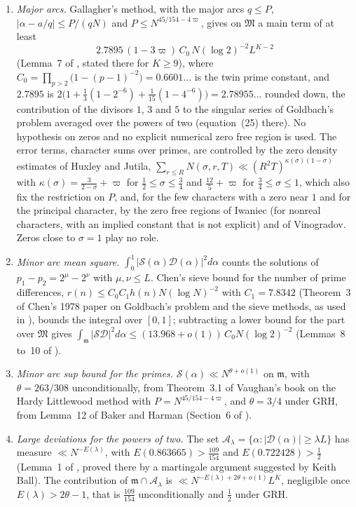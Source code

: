 \begin{enumerate}
\item[(1)] \emph{Major arcs.} Gallagher's method, with the major arcs $q\le P$, $|\alpha-a/q|\le P/(qN)$ and $P\le N^{45/154-4\varpi}$, gives on $\mathfrak M$ a main term of at least
\[
2.7895\,(1-3\varpi)\,C_0\,N(\log2)^{-2}L^{K-2}
\]
(Lemma~7 of \cite{HBP02}, stated there for $K\ge9$), where $C_0=\prod_{p>2}\big(1-(p-1)^{-2}\big)=0.6601\ldots$ is the twin prime constant, and $2.7895$ is $2\big(1+\tfrac13(1-2^{-6})+\tfrac1{15}(1-4^{-6})\big)=2.78955\ldots$ rounded down, the contribution of the divisors $1$, $3$ and $5$ to the singular series of Goldbach's problem averaged over the powers of two (equation~(25) there). No hypothesis on zeros and no explicit numerical zero free region is used. The error terms, character sums over primes, are controlled by the zero density estimates of Huxley and Jutila, $\sum_{r\le R}N(\sigma,r,T)\ll(R^2T)^{\kappa(\sigma)(1-\sigma)}$ with $\kappa(\sigma)=\tfrac3{2-\sigma}+\varpi$ for $\tfrac12\le\sigma\le\tfrac34$ and $\tfrac{12}5+\varpi$ for $\tfrac34\le\sigma\le1$, which also fix the restriction on $P$, and, for the few characters with a zero near $1$ and for the principal character, by the zero free regions of Iwaniec (for nonreal characters, with an implied constant that is not explicit) and of Vinogradov. Zeros close to $\sigma=1$ play no role.
\item[(2)] \emph{Minor arc mean square.} $\int_0^1|\mathcal S(\alpha)\mathcal D(\alpha)|^2d\alpha$ counts the solutions of $p_1-p_2=2^\mu-2^\nu$ with $\mu,\nu\le L$. Chen's sieve bound for the number of prime differences, $r(n)\le C_0C_1h(n)N(\log N)^{-2}$ with $C_1=7.8342$ (Theorem~3 of Chen's 1978 paper on Goldbach's problem and the sieve methods, as used in \cite{HBP02}), bounds the integral over $[0,1]$; subtracting a lower bound for the part over $\mathfrak M$ gives $\int_{\mathfrak m}|\mathcal S\mathcal D|^2d\alpha\le(13.968+o(1))\,C_0N(\log2)^{-2}$ (Lemmas~8 to~10 of \cite{HBP02}).
\item[(3)] \emph{Minor arc sup bound for the primes.} $\mathcal S(\alpha)\ll N^{\theta+o(1)}$ on $\mathfrak m$, with $\theta=263/308$ unconditionally, from Theorem~3.1 of Vaughan's book on the Hardy Littlewood method with $P=N^{45/154-4\varpi}$, and $\theta=3/4$ under GRH, from Lemma~12 of Baker and Harman (Section~6 of \cite{HBP02}).
\item[(4)] \emph{Large deviations for the powers of two.} The set $\mathcal A_\lambda=\{\alpha:|\mathcal D(\alpha)|\ge\lambda L\}$ has measure $\ll N^{-E(\lambda)}$, with $E(0.863665)>\tfrac{109}{154}$ and $E(0.722428)>\tfrac12$ (Lemma~1 of \cite{HBP02}, proved there by a martingale argument suggested by Keith Ball). The contribution of $\mathfrak m\cap\mathcal A_\lambda$ is $\ll N^{-E(\lambda)+2\theta+o(1)}L^K$, negligible once $E(\lambda)>2\theta-1$, that is $\tfrac{109}{154}$ unconditionally and $\tfrac12$ under GRH.

\end{enumerate}
